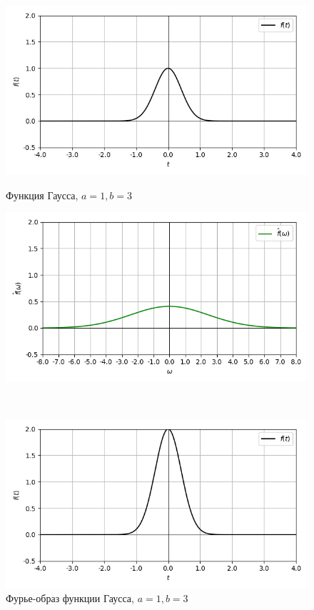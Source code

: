 \documentclass[a4paper]{article}
\begin{document}
\begin{figure}[H]
        \begin{minipage}{0.5\textwidth}
        \centering \includegraphics[width=\textwidth]{gaussian/real_graph_1_3.png}
        \caption{Функция Гаусса, $a = 1, b = 3$}
    \end{minipage}\hfill
    \begin{minipage}{0.5\textwidth}
        \centering \includegraphics[width=\textwidth]{gaussian/real_fourier_1_3.png}
        \caption{Фурье-образ функции Гаусса, $a = 1, b = 3$}
    \end{minipage}\\[1em]
        \begin{minipage}{0.5\textwidth}
        \centering \includegraphics[width=\textwidth]{gaussian/real_graph_2_3.png}

\end{minipage}
\end{figure}
\end{document}
